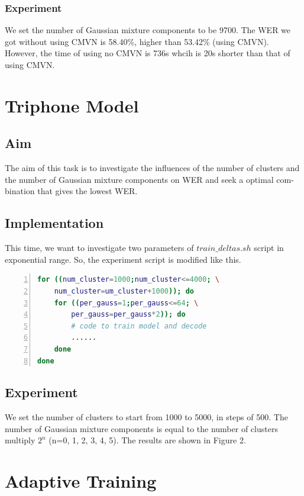 \documentclass[]{article}
\begin{document}
\begin{multicols*}{2}
\subsubsection{Experiment}
We set the number of Gaussian mixture components to be 9700. The WER we got without using CMVN is 58.40\%, higher than 53.42\% (using CMVN). However, the time of using no CMVN is 736s whcih is 20s  shorter than that of using CMVN.


\section{Triphone Model}
\subsection{Aim}
The aim of this task is to investigate the influences of the number of clusters and the number of Gaussian mixture components on WER and seek a optimal com- bination that gives the lowest WER.
\subsection{Implementation}
This time, we want to investigate two parameters of $train\_deltas.sh$ script in exponential range. So, the experiment script is modified like this.
\begin{lstlisting}[language=sh,showstringspaces=false,numbers=left,tabsize=4, xleftmargin=\parindent, frame=single, basicstyle=\tiny] 
for ((num_cluster=1000;num_cluster<=4000; \
	num_cluster=um_cluster+1000)); do
	for ((per_gauss=1;per_gauss<=64; \
		per_gauss=per_gauss*2)); do
		# code to train model and decode
		......
	done
done
\end{lstlisting}

\subsection{Experiment}
We set the number of clusters to start from 1000 to 5000, in steps of 500. The number of Gaussian mixture components is equal to the number of clusters multiply $2^n$ (n=0, 1, 2, 3, 4, 5). The results are shown in Figure 2.

\begin{center}

\end{center}

\section{Adaptive Training}

\end{multicols*}
\end{document}
